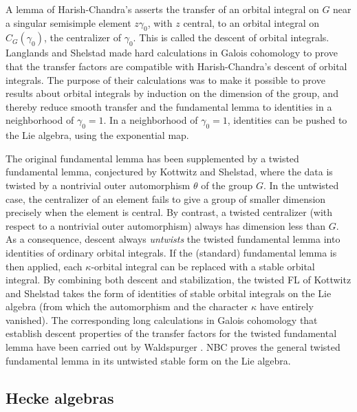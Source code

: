 \documentclass[brochure,english,12pt]{bourbaki}
\begin{document}
A lemma of Harish-Chandra's asserts the transfer of an orbital
integral on $G$ near a singular semisimple element $z\gamma_0$, with
$z$ central, to an orbital integral on $C_G(\gamma_0)$, the
centralizer of $\gamma_0$.  This is called the descent of orbital
integrals.  Langlands and Shelstad made hard calculations in
Galois cohomology to prove that the transfer factors are compatible
with Harish-Chandra's descent of orbital integrals.  The purpose of
their calculations was to make it possible to prove results about
orbital integrals by induction on the dimension of the group, and
thereby reduce smooth transfer and the fundamental lemma to identities
in a neighborhood of $\gamma_0=1$.  In a neighborhood of $\gamma_0=1$,
identities can be pushed to the Lie algebra, using the exponential map.

The original fundamental lemma has been supplemented by a twisted
fundamental lemma, conjectured by Kottwitz and Shelstad, where the
data is twisted by a nontrivial outer automorphism $\theta$ of the
group $G$.  In the untwisted case, the centralizer of an element fails
to give a group of smaller dimension precisely when the element is
central.  By contrast, a twisted centralizer (with respect to a
nontrivial outer automorphism) always has dimension less than $G$.  As
a consequence, descent always {\it untwists} the twisted fundamental
lemma into identities of ordinary orbital integrals.  If the
(standard) fundamental lemma is then applied, each $\kappa$-orbital
integral can be replaced with a stable orbital integral.  By combining both
descent and stabilization, the twisted FL of Kottwitz and Shelstad
takes the form of identities of stable orbital integrals on the Lie
algebra (from which the automorphism and the character $\kappa$ have
entirely vanished).  The corresponding long calculations in Galois
cohomology that establish descent properties of the transfer factors
for the twisted fundamental lemma have been carried out by
Waldspurger \cite{twisted-w}.  NBC proves the general twisted fundamental lemma in
its untwisted stable form on the Lie algebra.



\subsection{Hecke algebras}
\end{document}
